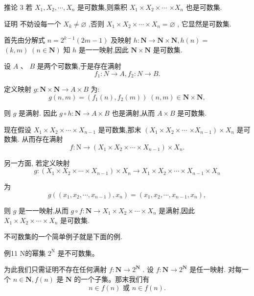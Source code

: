 推论 3 若 ${X}_{1},{X}_{2},\cdots ,{X}_{n}$ 是可数集,则乘积 ${X}_{1} \times  {X}_{2} \times  \cdots$  $\times  {X}_{n}$ 也是可数集.

证明 不妨设每一个 ${X}_{k} \neq  \varnothing$ ,否则 ${X}_{1} \times  {X}_{2} \times  \cdots  \times  {X}_{n} = \varnothing$ , 它显然是可数集.

首先由分解式 $n = {2}^{k - 1}\left( {{2m} - 1}\right)$ 及映射 $h : \mathbf{N} \rightarrow  \mathbf{N} \times  \mathbf{N},h\left( n\right)  =$  $\left( {k,m}\right) \;\left( {n \in  \mathbf{N}}\right)$ 知 $h$ 是一一映射,因此 $\mathbf{N} \times  \mathbf{N}$ 是可数集.

设 $A\text{ 、 }B$ 是两个可数集,于是存在满射
$${f}_{1} : N \rightarrow  A,{f}_{2} : N \rightarrow  B.$$

定义映射 $g : \mathbf{N} \times  \mathbf{N} \rightarrow  A \times  B$ 为:
$$g\left( {n,m}\right)  = \left( {{f}_{1}\left( n\right) ,{f}_{2}\left( m\right) }\right) \;\left( {n,m}\right)  \in  \mathbf{N} \times  \mathbf{N},$$

则 $g$ 是满射. 因此 $g \circ  h : \mathbf{N} \rightarrow  A \times  B$ 也是满射,从而 $A \times  B$ 是可数集.

现在假设 ${X}_{1} \times  {X}_{2} \times  \cdots  \times  {X}_{n - 1}$ 是可数集,那末 $\left( {{X}_{1} \times  {X}_{2} \times  \cdots }\right.$  $\left. {\times {X}_{n - 1}}\right)  \times  {X}_{n}$ 是可数集. 从而存在满射
$$f : \mathrm{N} \rightarrow  \left( {{X}_{1} \times  {X}_{2} \times  \cdots  \times  {X}_{n - 1}}\right)  \times  {X}_{n}.$$

另一方面, 若定义映射
$$g : \left( {{X}_{1} \times  {X}_{2} \times  \cdots  \times  {X}_{n - 1}}\right)  \times  {X}_{n} \rightarrow  {X}_{1} \times  {X}_{2} \times  \cdots  \times  {X}_{n - 1} \times  {X}_{n}$$

为
$$g\left( {\left( {{x}_{1},{x}_{2},\cdots ,{x}_{n - 1}}\right) ,{x}_{n}}\right)  = \left( {{x}_{1},{x}_{2},\cdots ,{x}_{n - 1},{x}_{n}}\right) ,$$

则 $g$ 是一一映射,从而 $g \circ  f : \mathbf{N} \rightarrow  {X}_{1} \times  {X}_{2} \times  \cdots  \times  {X}_{n}$ 是满射,因此 ${X}_{1} \times  {X}_{2} \times  \cdots  \times  {X}_{n}$ 是可数集.

不可数集的一个简单例子就是下面的例.

例11 N的幂集 ${2}^{\mathrm{N}}$ 是不可数集。

为此我们只需证明不存在任何满射 $f : \mathbf{N} \rightarrow  {2}^{\mathbf{N}}$ . 设 $f : \mathbf{N} \rightarrow  {2}^{\mathbf{N}}$ 是任一映射. 对每一个 $n \in  \mathbf{N},f\left( n\right)$ 是 $\mathbf{N}$ 的一个子集。那末我们有
$$n \in  f\left( n\right) \text{ 或 }n \in  f\left( n\right) .$$

